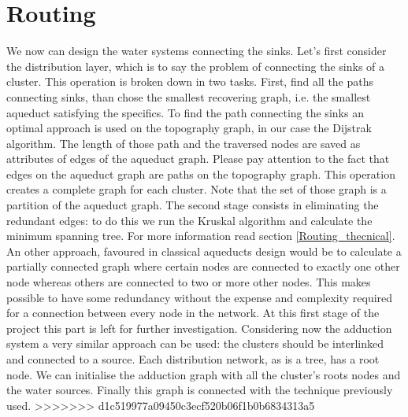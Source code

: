 \section{Routing}
\label{Routing}
We now can design the water systems connecting the sinks. Let’s first consider the distribution layer, which is to say the problem of connecting the sinks of a cluster. This operation is broken down in two tasks. First, find all the paths connecting sinks, than chose the smallest recovering graph, i.e. the smallest aqueduct satisfying the specifics. \hfill 
To find the path connecting the sinks an optimal approach is used on the topography graph, in our case the Dijstrak algorithm. The length of those path and the traversed nodes are saved as attributes of edges of the aqueduct graph. Please pay attention to the fact that edges on the aqueduct graph are paths on the topography graph. This operation creates a complete graph for each cluster. Note that the set of those graph is a partition of the aqueduct graph. \hfill 
The second stage consists in eliminating the redundant edges: to do this we run the Kruskal algorithm and calculate the minimum spanning tree. For more information read section \ref {Routing_thecnical}. An other approach, favoured in classical aqueducts design would be to calculate a partially connected graph where certain nodes are connected to exactly one other node whereas others are connected to two or more other nodes. This makes possible to have some redundancy without the expense and complexity required for a connection between every node in the network. At this first stage of the project this part is left for further investigation.
Considering now the adduction system a very similar approach can be used: the clusters should be interlinked and connected to a source. Each distribution network, as is a tree, has a root node. We can initialise the adduction graph with all the cluster's roots nodes and the water sources. Finally this graph is connected with the technique previously used.
>>>>>>> d1c519977a09450c3ecf520b06f1b0b6834313a5

